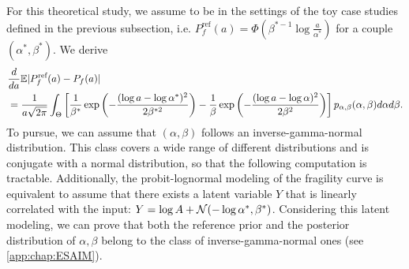     For this theoretical study, we assume to be in the settings of the toy case studies defined in the previous subsection, i.e. $P^{\text{ref}}_f(a)=\Phi\left(\beta^{\ast -1}\log\frac{a}{\alpha^{\ast}}\right)$ for a couple $(\alpha^\ast,\beta^\ast)$.
    We derive
        \begin{align}\nonumber
            &\frac{d}{da}\mathbb{E}|P^{\text{ref}}_f(a)-P_f(a)|\\ &= \frac{1}{a\sqrt{2\pi}}\int_\Theta \left[\frac{1}{\beta^\ast}\exp\left(-\frac{(\log a-\log\alpha^\ast)^2}{2\beta^{\ast 2}}\right)-\frac{1}{\beta} \exp\left(-\frac{(\log a-\log\alpha)^2}{2\beta^2}\right)\right] p_{\alpha,\beta}(\alpha,\beta)d\alpha d\beta. \label{eq:derive-P-EP}   
        \end{align}
    To pursue, we can assume that $(\alpha,\beta)$ follows an inverse-gamma-normal distribution. This class covers a wide range of different distributions and is conjugate with a normal distribution, so that the following computation is tractable. Additionally, the probit-lognormal modeling of the fragility curve is equivalent to assume that there exists a latent variable $Y$ that is linearly correlated with the input: $Y=\log A +\mathcal{N}(-\log\alpha^\ast,\beta^\ast)$. Considering this latent modeling, we can prove that both the reference prior and the posterior distribution of $\alpha,\beta$ belong to the class of inverse-gamma-normal ones (see \cref{app:chap:ESAIM}).
